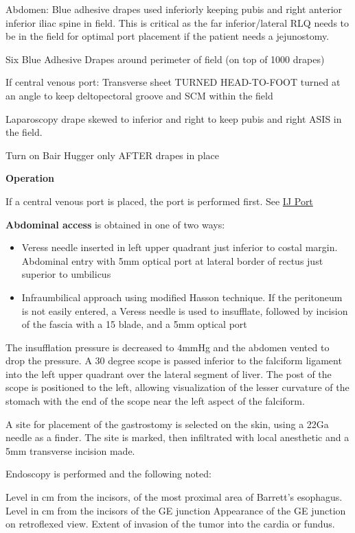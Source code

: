 \documentclass[
]{book}
\providecommand{\tightlist}{%
  \setlength{\itemsep}{0pt}\setlength{\parskip}{0pt}}
\begin{document}
Abdomen: Blue adhesive drapes used inferiorly keeping pubis and right anterior inferior iliac spine in field. This is critical as the far inferior/lateral RLQ needs to be in the field for optimal port placement if the patient needs a jejunostomy.

Six Blue Adhesive Drapes around perimeter of field (on top of 1000 drapes)

If central venous port: Transverse sheet TURNED HEAD-TO-FOOT turned at an angle to keep deltopectoral groove and SCM within the field

Laparoscopy drape skewed to inferior and right to keep pubis and right ASIS in the field.

Turn on Bair Hugger only AFTER drapes in place

\textbf{Operation}

If a central venous port is placed, the port is performed first. See \protect\hyperlink{cv_port_salo}{IJ Port}

\textbf{Abdominal access} is obtained in one of two ways:

\begin{itemize}
\tightlist
\item
  Veress needle inserted in left upper quadrant just inferior to costal margin. Abdominal entry with 5mm optical port at lateral border of rectus just superior to umbilicus
\item
  Infraumbilical approach using modified Hasson technique. If the peritoneum is not easily entered, a Veress needle is used to insufflate, followed by incision of the fascia with a 15 blade, and a 5mm optical port
\end{itemize}

The insufflation pressure is decreased to 4mmHg and the abdomen vented to drop the pressure. A 30 degree scope is passed inferior to the falciform ligament into the left upper quadrant over the lateral segment of liver. The post of the scope is positioned to the left, allowing visualization of the lesser curvature of the stomach with the end of the scope near the left aspect of the falciform.

A site for placement of the gastrostomy is selected on the skin, using a 22Ga needle as a finder. The site is marked, then infiltrated with local anesthetic and a 5mm transverse incision made.

Endoscopy is performed and the following noted:

Level in cm from the incisors, of the most proximal area of Barrett's esophagus.
Level in cm from the incisors of the GE junction
Appearance of the GE junction on retroflexed view. Extent of invasion of the tumor into the cardia or fundus.
\end{document}
